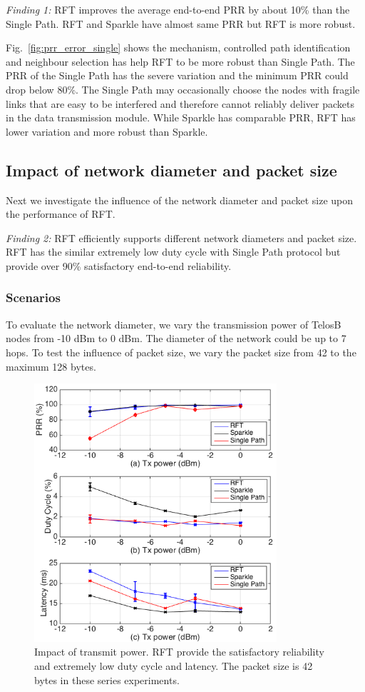 \documentclass[conference]{IEEEtran}
\begin{document}
\emph{Finding 1:} 
RFT improves the average end-to-end PRR by about 10\% than the Single Path. RFT and Sparkle have almost same PRR but RFT is more robust.

Fig.~\ref{fig:prr_error_single} shows the mechanism, controlled path identification and neighbour selection has help RFT to be more robust than Single Path. The PRR of the Single Path has the severe variation and the minimum PRR could drop below 80\%. The Single Path may occasionally choose the nodes with fragile links that are easy to be interfered and therefore cannot reliably deliver packets in the data transmission module. While Sparkle has comparable PRR, RFT has lower variation and more robust than Sparkle.
\subsection{Impact of network diameter and packet size}
\label{sec:txpwr&pktsize}
Next we investigate the influence of the network diameter and packet size upon the performance of RFT. 

\emph{Finding 2:} 
RFT efficiently supports different network diameters and packet size. RFT has the similar extremely low duty cycle with Single Path protocol but provide over 90\% satisfactory end-to-end reliability. 
\subsubsection{Scenarios}
To evaluate the network diameter, we vary the transmission power of TelosB nodes from -10 dBm to 0 dBm. The diameter of the network could be up to 7 hops. To test the influence of packet size, we vary the packet size from 42 to the maximum 128 bytes.
\begin{figure}
\centering
\includegraphics[width=9cm]{errorbar_defaultpower2.png}
\caption{Impact of transmit power. RFT provide the satisfactory reliability and extremely low duty cycle and latency. The packet size is 42 bytes in these series experiments.}
\label{fig:power}
\end{figure}
\end{document}
